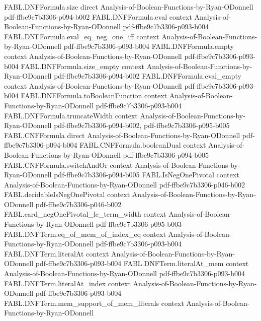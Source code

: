 \begin{theorem}
\proofstep
  {FABL.DNFFormula.size}
  {direct}
  {Analysis-of-Boolean-Functions-by-Ryan-ODonnell}
  {pdf-ffbe9c7b3306-p094-b002}
\proofstep
  {FABL.DNFFormula.eval}
  {context}
  {Analysis-of-Boolean-Functions-by-Ryan-ODonnell}
  {pdf-ffbe9c7b3306-p093-b004}
\proofstep
  {FABL.DNFFormula.eval_eq_neg_one_iff}
  {context}
  {Analysis-of-Boolean-Functions-by-Ryan-ODonnell}
  {pdf-ffbe9c7b3306-p093-b004}
\proofstep
  {FABL.DNFFormula.empty}
  {context}
  {Analysis-of-Boolean-Functions-by-Ryan-ODonnell}
  {pdf-ffbe9c7b3306-p093-b004}
\proofstep
  {FABL.DNFFormula.size_empty}
  {context}
  {Analysis-of-Boolean-Functions-by-Ryan-ODonnell}
  {pdf-ffbe9c7b3306-p094-b002}
\proofstep
  {FABL.DNFFormula.eval_empty}
  {context}
  {Analysis-of-Boolean-Functions-by-Ryan-ODonnell}
  {pdf-ffbe9c7b3306-p093-b004}
\proofstep
  {FABL.DNFFormula.toBooleanFunction}
  {context}
  {Analysis-of-Boolean-Functions-by-Ryan-ODonnell}
  {pdf-ffbe9c7b3306-p093-b004}
\proofstep
  {FABL.DNFFormula.truncateWidth}
  {context}
  {Analysis-of-Boolean-Functions-by-Ryan-ODonnell}
  {pdf-ffbe9c7b3306-p094-b002,
    pdf-ffbe9c7b3306-p095-b005}
\proofstep
  {FABL.CNFFormula}
  {direct}
  {Analysis-of-Boolean-Functions-by-Ryan-ODonnell}
  {pdf-ffbe9c7b3306-p094-b004}
\proofstep
  {FABL.CNFFormula.booleanDual}
  {context}
  {Analysis-of-Boolean-Functions-by-Ryan-ODonnell}
  {pdf-ffbe9c7b3306-p094-b005}
\proofstep
  {FABL.CNFFormula.switchAndOr}
  {context}
  {Analysis-of-Boolean-Functions-by-Ryan-ODonnell}
  {pdf-ffbe9c7b3306-p094-b005}
\proofstep
  {FABL.IsNegOnePivotal}
  {context}
  {Analysis-of-Boolean-Functions-by-Ryan-ODonnell}
  {pdf-ffbe9c7b3306-p046-b002}
\proofstep
  {FABL.decidableIsNegOnePivotal}
  {context}
  {Analysis-of-Boolean-Functions-by-Ryan-ODonnell}
  {pdf-ffbe9c7b3306-p046-b002}
\proofstep
  {FABL.card_negOnePivotal_le_term_width}
  {context}
  {Analysis-of-Boolean-Functions-by-Ryan-ODonnell}
  {pdf-ffbe9c7b3306-p095-b003}
\proofstep
  {FABL.DNFTerm.eq_of_mem_of_index_eq}
  {context}
  {Analysis-of-Boolean-Functions-by-Ryan-ODonnell}
  {pdf-ffbe9c7b3306-p093-b004}
\proofstep
  {FABL.DNFTerm.literalAt}
  {context}
  {Analysis-of-Boolean-Functions-by-Ryan-ODonnell}
  {pdf-ffbe9c7b3306-p093-b004}
\proofstep
  {FABL.DNFTerm.literalAt_mem}
  {context}
  {Analysis-of-Boolean-Functions-by-Ryan-ODonnell}
  {pdf-ffbe9c7b3306-p093-b004}
\proofstep
  {FABL.DNFTerm.literalAt_index}
  {context}
  {Analysis-of-Boolean-Functions-by-Ryan-ODonnell}
  {pdf-ffbe9c7b3306-p093-b004}
\proofstep
  {FABL.DNFTerm.mem_support_of_mem_literals}
  {context}
  {Analysis-of-Boolean-Functions-by-Ryan-ODonnell}

\end{theorem}

